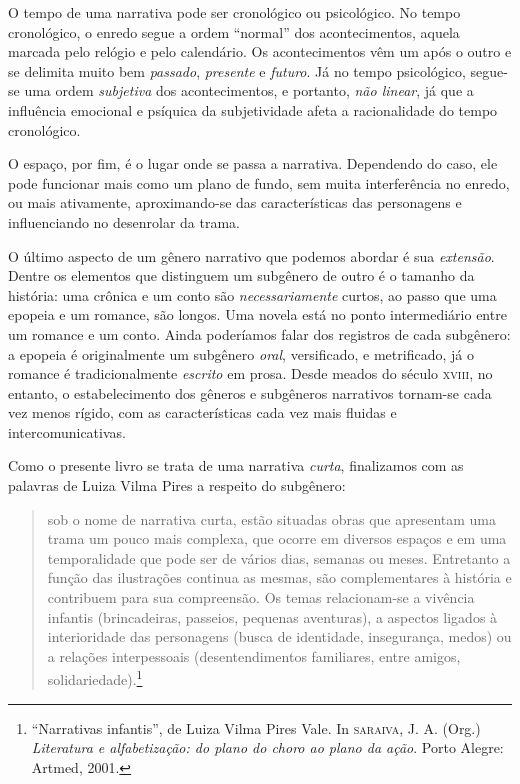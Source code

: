 \documentclass[11pt]{extarticle}
\begin{document}
O tempo de uma narrativa pode ser cronológico ou psicológico.
No tempo cronológico, o enredo segue a ordem ``normal'' dos acontecimentos,
aquela marcada pelo relógio e pelo calendário. Os acontecimentos vêm um após o 
outro e se delimita muito bem \textit{passado}, \textit{presente} e \textit{futuro}.
Já no tempo psicológico, segue-se uma ordem \textit{subjetiva} dos acontecimentos, 
e portanto, \textit{não linear}, já que a influência emocional e psíquica 
da subjetividade afeta a racionalidade do tempo cronológico. 

O espaço, por fim, é o lugar onde se passa a narrativa. Dependendo do caso, 
ele pode funcionar mais como um plano de fundo, sem muita interferência
no enredo, ou mais ativamente, aproximando-se das características das personagens
e influenciando no desenrolar da trama. 

O último aspecto de um gênero narrativo que podemos abordar é sua 
\textit{extensão}. Dentre os elementos que distinguem um subgênero 
de outro é o tamanho da história: uma crônica e um conto são \textit{necessariamente}
curtos, ao passo que uma epopeia e um romance, são longos. Uma novela
está no ponto intermediário entre um romance e um conto.
Ainda poderíamos falar dos registros de cada subgênero: 
a epopeia é originalmente um subgênero \textit{oral}, versificado, e metrificado,
já o romance é tradicionalmente \textit{escrito} em prosa. 
Desde meados do século \textsc{xviii}, no entanto, o estabelecimento
dos gêneros e subgêneros narrativos tornam-se cada vez menos rígido,
com as características cada vez mais fluidas e intercomunicativas.

Como o presente livro se trata de uma narrativa \textit{curta},
finalizamos com as palavras de Luiza Vilma Pires a respeito do
subgênero:

\begin{quote}
sob o nome de narrativa curta, estão situadas obras que apresentam uma trama 
um pouco mais complexa, que ocorre em diversos espaços e em uma temporalidade 
que pode ser de vários dias, semanas ou meses. Entretanto a função das ilustrações 
continua as mesmas, são complementares à história e contribuem para sua compreensão. 
Os temas relacionam-se a vivência infantis (brincadeiras, passeios, pequenas aventuras), 
a aspectos ligados à interioridade das personagens (busca de identidade, insegurança, 
medos) ou a relações interpessoais (desentendimentos familiares, entre amigos, solidariedade).\footnote{“Narrativas infantis”, de Luiza Vilma Pires Vale. In \textsc{saraiva}, J. A. (Org.) \textit{Literatura e alfabetização: do plano do choro ao plano da ação}. Porto Alegre: Artmed, 2001.} 
\end{quote}
\end{document}
